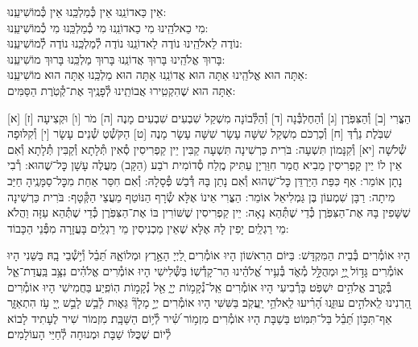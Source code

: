 \documentclass[twoside, openany, parskip=half, 11pt]{book}
\begin{document}
\fullkaddish




\label{einkelokeinu}
\hfill אֵין כַּאדוֹנֵֽנוּ \hfill אֵין כְּ֯מַלְכֵּֽנוּ \hfill אֵין כְּ֯מוֹשִׁיעֵֽנוּ:\\
מִי כֵאלֹהֵֽינוּ \hfill מִי כַאדוֹנֵֽנוּ \hfill מִי כְ֯מַלְכֵּֽנוּ \hfill מִי כְ֯מוֹשִׁיעֵֽנוּ:\\
נוֹדֶה לֵאלֹהֵֽינוּ \hfill נוֹדֶה לַאדוֹנֵֽנוּ \hfill נוֹדֶה לְ֯מַלְכֵּֽנוּ \hfill נוֹדֶה לְ֯מוֹשִׁיעֵֽנוּ:\\
בָּרוּךְ אֱלֹהֵֽינוּ \hfill בָּרוּךְ אֲדוֹנֵֽנוּ \hfill בָּרוּךְ מַלְכֵּֽנוּ \hfill בָּרוּךְ מוֹשִׁיעֵֽנוּ:\\
אַתָּה הוּא אֱלֹהֵֽינוּ אַתָּה הוּא אֲדוֹנֵֽנוּ אַתָּה הוּא מַלְכֵּֽנוּ אַתָּה הוּא מוֹשִׁיעֵֽנוּ:\\
אַתָּה הוּא שֶׁהִקְטִֽירוּ אֲבוֹתֵֽינוּ לְ֯פָנֶֽיךָ אֶת־קְ֯טֹֽרֶת הַסַּמִּים:

[א] הַצֳּרִי [ב] וְ֯הַצִּפֹּֽרֶן [ג] וְ֯הַחֶלְבְּ֯נָה [ד] וְ֯הַלְּ֯בוֹנָה מִשְׁקַל שִׁבְעִים שִׁבְעִים מָנֶה [ה] מֹר [ו] וּקְצִיעָה [ז] שִׁבֹּֽלֶת נֵרְ֯דְּ [ח] וְ֯כַרְכֹּם מִשְׁקַל שִׁשָּׁה עָשָׂר שִׁשָּׁה עָשָׂר מָנֶה [ט] הַקֹּשְׁ֯טְ שְׁ֯נֵים עָשָׂר [י] וְ֯קִלּוּפָה שְׁ֯לֹשָׁה [יא] וְ֯קִנָּמוֹן תִּשְׁעָה: בֹּרִית כַּרְשִׁינָה תִּשְׁעָה קַבִּין יֵין קַפְרִיסִין סְ֯אִין תְּ֯לָתָא וְ֯קַבִּין תְּ֯לָתָא וְ֯אִם אֵין לוֹ יֵין קַפְרִיסִין מֵבִיא חֲמַר חִוַּרְיָן עַתִּיק מֶֽלַח סְ֯דוֹמִית רֹבַע (הַקָּב) מַעֲלֶה עָשָׁן כׇּל־שֶׁהוּא: רְ֯בִי נָתָן אוֹמֵר: אַף כִּפַּת הַיַּרְדֵּן כׇּל־שֶׁהוּא וְ֯אִם נָתַן בָּהּ דְּ֯בַשׁ פְּ֯סָלָהּ: וְ֯אִם חִסַּר אַחַת מִכׇּל־סַמָּנֶֽיהָ חַיַּב מִיתָה: רַבָּן שִׁמְעוֹן בֶּן גַּמְלִיאֵל אוֹמֵר: הַצֳּרִי אֵינוֹ אֶלָּא שְׂ֯רָף הַנּוֹטֵף מֵעֲצֵי הַקְּ֯טָף: בֹּרִית כַּרְשִׁינָה שֶׁשָּׁפִין בָּהּ אֶת־הַצִּפֹּֽרֶן כְּ֯דֵי שֶׁתְּ֯הֵא נָאָה: יֵין קַפְרִיסִין שֶׁשּׁוֹרִין בּוֹ אֶת־הַצִּפֹּֽרֶן כְּ֯דֵי שֶׁתְּ֯הֵא עַזָּה וַהֲלֹא מֵי רַגְלַֽיִם יָפִין לָהּ אֶלָּא שֶׁאֵין מַכְנִיסִין מֵי רַגְלַֽיִם בָּעֲזָרָה מִפְּ֯נֵי הַכָּבוֹד:

\vspace{-.3\baselineskip}
הָיוּ אוֹמְ֯רִים בְּ֯בֵית הַמִּקְדָּשׁ:
בַּיּוֹם הַרִאשׁוֹן הָיוּ אוֹמְ֯רִים לַ֭יְיָ הָאָ֣רֶץ וּמְלוֹאָ֑הּ תֵּ֝בֵ֗ל וְ֯י֣שְׁ֯בֵי בָֽהּ׃
בַּשֵּׁנִי הָיוּ אוֹמְ֯רִים גָּד֣וֹל ֖יְיָ֣ וּמְהֻלָּ֣ל מְ֯אֹ֑ד בְּ֯עִ֥יר אֱ֝לֹהֵ֗ינוּ הַר־קָדְ֯שֽׁוֹ׃
בַּשְּׁ֯לִישִׁי הָיוּ אוֹמְ֯רִים אֱלֹהִ֗ים נִצָּ֥ב בַּֽעֲדַת־אֵ֑ל בְּ֯קֶ֖רֶב אֱלֹהִ֣ים יִשְׁפֹּֽט׃ בָּרְ֯בִיעִי הָיוּ אוֹמְ֯רִים אֵֽל־נְ֯קָמ֥וֹת יְיָ֑ אֵ֖ל נְ֯קָמ֣וֹת הֽוֹפִֽיַע׃ בַּחֲמִישִׁי הָיוּ אוֹמְ֯רִים הַ֭רְנִינוּ לֵֽאלֹהִ֣ים עוּזֵּ֑נוּ הָ֝רִ֗יעוּ לֵֽאלֹהֵ֥י יַֽעֲקֹֽב׃ בַּשִּׁשִּׁי הָיוּ אוֹמְ֯רִים יְיָ֣ מָלָךְ֘ גֵּא֢וּת לָ֫בֵ֥שׁ לָבֵ֣שׁ יְ֖יָ עֹ֥ז הִתְאַזָּ֑ר אַף־תִּכּ֣וֹן תֵּ֝בֵ֗ל בַּל־תִּמּֽוֹט׃ בַּשַׁבָּת הָיוּ אוֹמְ֯רִים מִזְמ֥וֹר שִׁ֝֗יר לְ֯י֥וֹם הַשַּׁבָּֽת׃ מִזְמוֹר שִׁיר לֶעָתִיד לָבוֹא לְ֯יוֹם שֶׁכֻּלּוֹ שַׁבָּת וּמְנוּחָה לְ֯חַיֵּי הָעוֹלָמִים׃
\end{document}

